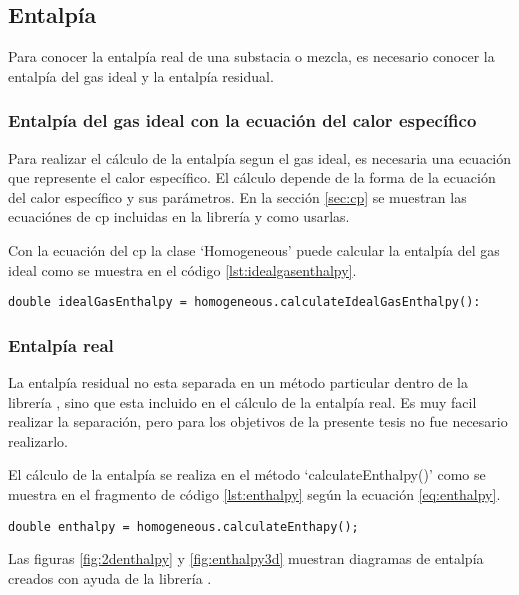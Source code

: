 \subsection{Entalpía}\label{subsec:enthalpy}

	Para conocer la entalpía real de una substacia o mezcla, es necesario conocer la entalpía del gas ideal y la entalpía residual.

\subsubsection{Entalpía del gas ideal con la ecuación del calor específico}
	Para realizar el cálculo de la entalpía segun el gas ideal, es necesaria una ecuación que represente el calor específico. El cálculo depende de la forma de la ecuación del calor específico y sus parámetros. En la sección \ref{sec:cp} se muestran las ecuaciónes de cp incluidas en la librería y como usarlas.

	Con la ecuación del cp la clase `Homogeneous' puede calcular la entalpía del gas ideal como se muestra en el código \ref{lst:idealgasenthalpy}.

	\begin{lstlisting}[label={lst:idealgasenthalpy},caption={Cálculo de la entalpía del gas ideal.}]
	double idealGasEnthalpy = homogeneous.calculateIdealGasEnthalpy():
	\end{lstlisting}
	
\subsubsection{Entalpía real}

	La entalpía residual no esta separada en un método particular dentro de la librería \Materia, sino que esta incluido en el cálculo de la entalpía real. Es muy facil realizar la separación, pero para los objetivos de la presente tesis no fue necesario realizarlo.

	El cálculo de la entalpía se realiza en el método `calculateEnthalpy()' como se muestra en el fragmento de código \ref{lst:enthalpy} según la ecuación \ref{eq:enthalpy}. 

\begin{lstlisting}[caption={Cálculo de la entalpía real},label={lst:enthalpy}]
	double enthalpy = homogeneous.calculateEnthapy();
\end{lstlisting}
	
	Las figuras \ref{fig:2denthalpy} y \ref{fig:enthalpy3d} muestran diagramas de entalpía creados con ayuda de la librería \Materia.

